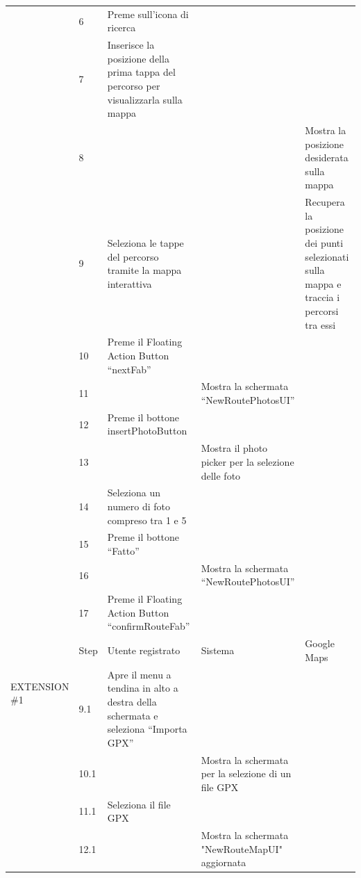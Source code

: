 \documentclass{natourDoc}
\begin{document}
\begin{tabularx}{\linewidth}{|l| p{1cm} | p{4cm} | X | X|}
	\cline{2-5} & 6 & Preme sull’icona di ricerca & & \\

	\cline{2-5} & 7 & Inserisce la posizione della prima tappa del percorso per visualizzarla sulla mappa & & \\

	\cline{2-5} & 8 & & & Mostra la posizione desiderata sulla mappa \\

	\cline{2-5} & 9 & Seleziona le tappe del percorso tramite la mappa interattiva & & Recupera la posizione dei punti selezionati sulla mappa e traccia i percorsi tra essi \\

	\cline{2-5} & 10 & Preme il Floating Action Button “nextFab” & & \\

	\cline{2-5} & 11 & & Mostra la schermata “NewRoutePhotosUI” & \\
	
	\cline{2-5} & 12 & Preme il bottone insertPhotoButton & & \\

	\cline{2-5} & 13 & & Mostra il photo picker per la selezione delle foto & \\

	\cline{2-5} & 14 & Seleziona un numero di foto compreso tra 1 e 5 & & \\

	\cline{2-5} & 15 & Preme il bottone “Fatto” & & \\

	\cline{2-5} & 16 & & Mostra la schermata “NewRoutePhotosUI” & \\

	\cline{2-5} & 17 & Preme il Floating Action Button “confirmRouteFab” & & \\

	\hline 
	\multirow{2}{*}{EXTENSION \#1}
	& Step & Utente registrato & Sistema & Google Maps \\
	
	\cline{2-5} & 9.1 & Apre il menu a tendina in alto a destra della schermata e seleziona “Importa GPX” & & \\

	\cline{2-5} & 10.1 & & Mostra la schermata per la selezione di un file GPX & \\

	\cline{2-5} & 11.1 & Seleziona il file GPX & & \\

	\cline{2-5} & 12.1 & & Mostra la schermata "NewRouteMapUI" aggiornata & \\

	\hline

	\end{tabularx}
\end{document}
